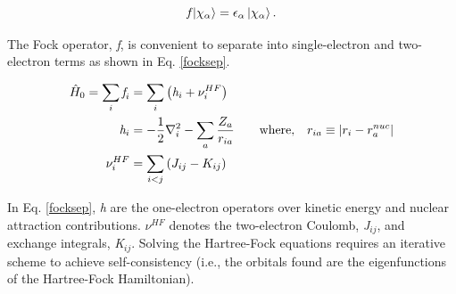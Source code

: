 \begin{theory}
  \begin{equation}
   \emph{f}\left|\chi_{\alpha}\right> = \epsilon_{\alpha}\left|\chi_{\alpha}\right>.
  \end{equation}
  
  The Fock operator, \emph{f}, is convenient to separate into single-electron and two-electron terms as shown in
  Eq. \ref{focksep}.
  
  \begin{equation}\label{focksep} %
    \begin{split}
      \hat{H}_{0} = \sum_{i} \emph{f}_{i} &= \sum_{i} \left(\emph{h}_{i} + \nu^{HF}_{i}\right) \\
      \emph{h}_{i} &= -\frac{1}{2}\nabla_{i}^{2} - \sum_{a} \frac{Z_{a}}{r_{ia}} \quad\quad \textrm{where,} \quad r_{ia} 
      \equiv \left|r_{i}-r_{a}^{nuc}\right| \\
      \nu^{HF}_{i} &= \sum_{i<j} \left(J_{ij} - K_{ij}\right)
    \end{split}
  \end{equation}
  
  In Eq. \ref{focksep}, \emph{h} are the one-electron operators over kinetic energy and nuclear attraction 
  contributions. $\nu^{HF}$ denotes the two-electron Coulomb, \emph{J}$_{ij}$, and exchange integrals, 
  \emph{K}$_{ij}$. Solving the Hartree-Fock equations requires an iterative scheme to achieve self-consistency 
  (i.e., the orbitals found are the eigenfunctions of the Hartree-Fock Hamiltonian).
  

\end{theory}

